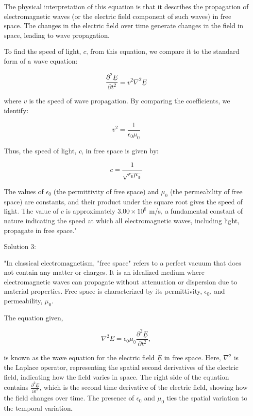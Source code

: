 The physical interpretation of this equation is that it describes the propagation of electromagnetic waves (or the electric field component of such waves) in free space. The changes in the electric field over time generate changes in the field in space, leading to wave propagation.

To find the speed of light, \(c\), from this equation, we compare it to the standard form of a wave equation:

\[
\frac{\partial^2 \underline{E}}{\partial t^{2}} = v^2 \nabla^{2}\underline{E}
\]

where \(v\) is the speed of wave propagation. By comparing the coefficients, we identify:

\[
v^2 = \frac{1}{\epsilon_{0}\mu_{0}}
\]

Thus, the speed of light, \(c\), in free space is given by:

\[
c = \frac{1}{\sqrt{\epsilon_{0}\mu_{0}}}
\]

The values of \(\epsilon_{0}\) (the permittivity of free space) and \(\mu_{0}\) (the permeability of free space) are constants, and their product under the square root gives the speed of light. The value of \(c\) is approximately \(3.00 \times 10^8\) m/s, a fundamental constant of nature indicating the speed at which all electromagnetic waves, including light, propagate in free space."

Solution 3: 

"In classical electromagnetism, "free space" refers to a perfect vacuum that does not contain any matter or charges. It is an idealized medium where electromagnetic waves can propagate without attenuation or dispersion due to material properties. Free space is characterized by its permittivity, \(\epsilon_0\), and permeability, \(\mu_0\).

The equation given,

\[
\nabla^{2}\underline{E} =  \epsilon_{0}\mu_{0}\frac{\partial^2 \underline{E}}{\partial t^{2}},
\]

is known as the wave equation for the electric field \(\underline{E}\) in free space. Here, \(\nabla^{2}\) is the Laplace operator, representing the spatial second derivatives of the electric field, indicating how the field varies in space. The right side of the equation contains \(\frac{\partial^2 \underline{E}}{\partial t^{2}}\), which is the second time derivative of the electric field, showing how the field changes over time. The presence of \(\epsilon_0\) and \(\mu_0\) ties the spatial variation to the temporal variation.

